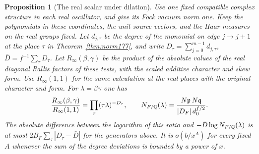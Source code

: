 \documentclass[a4paper,11pt]{article}
\newtheorem{proposition}{Proposition}[section]
\theoremstyle{definition}
\theoremstyle{remark}
\numberwithin{equation}{section}
\begin{document}
\begin{proposition}[The real scalar under dilation]
\label{prop:dilation179}
Use one fixed compatible complex structure in each real
oscillator, and give its Fock vacuum norm one. Keep the
polynomials in these coordinates, the unit source vectors,
and the Haar measures on the real groups fixed. Let
\(d_{j,\tau}\) be the degree of the monomial on edge
\(j\to j+1\) at the place \(\tau\) in
Theorem~\ref{thm:norm177}, and write
\(D_\tau=\sum_{j=0}^{m-1}d_{j,\tau}\),
\(\bar D=f^{-1}\sum_\tau D_\tau\).
Let \(R_\infty(\beta,\gamma)\) be the product of the absolute
values of the real diagonal Rallis factors of these tests,
with the scaled additive character and skew form. Use
\(R_\infty(1,1)\) for the same calculation at the real places
with the original character and form. For
\(\lambda=\beta\gamma\) one has
\begin{equation}
 \frac{R_\infty(\beta,\gamma)}{R_\infty(1,1)}
      =\prod_\tau(\tau\lambda)^{-D_\tau},\qquad
 N_{F/\mathbb Q}(\lambda)=
      \frac{N\mathfrak p\,N\mathfrak q}{|D_F|\,d_0^{f/2}} .
 \label{eq:dilation179}
\end{equation}
The absolute difference between the logarithm of this ratio
and \(-\bar D\log N_{F/\mathbb Q}(\lambda)\) is at most
\(2B_F\sum_\tau|D_\tau-\bar D|\) for the generators above.
It is \(o(b/x^A)\) for every fixed \(A\) whenever the sum
of the degree deviations is bounded by a power of \(x\).
\end{proposition}
\end{document}
